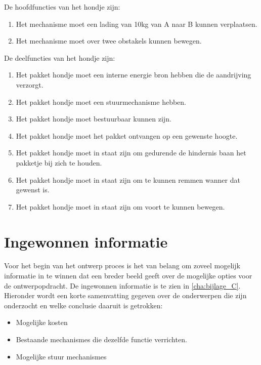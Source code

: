 De hoofdfuncties van het hondje zijn:
\begin{enumerate}
    \item Het mechanisme moet een lading van 10kg van A naar B kunnen verplaatsen.
    \item Het mechanisme moet over twee obstakels kunnen bewegen.
\end{enumerate}
\vspace{\baselineskip}
De deelfuncties van het hondje zijn:
\begin{enumerate}
    \item Het pakket hondje moet een interne energie bron hebben die de aandrijving verzorgt.
    \item Het pakket hondje moet een stuurmechanisme hebben.
    \item Het pakket hondje moet bestuurbaar kunnen zijn.
    \item Het pakket hondje moet het pakket ontvangen op een gewenste hoogte.
    \item Het pakket hondje moet in staat zijn om gedurende de hindernis baan het pakketje bij zich te houden.
    \item Het pakket hondje moet in staat zijn om te kunnen remmen wanner dat gewenst is.
    \item Het pakket hondje moet in staat zijn om voort te kunnen bewegen.
\end{enumerate}


\section{Ingewonnen informatie}
\label{se:Ingewonnen_informatie}
Voor het begin van het ontwerp proces is het van belang om zoveel mogelijk informatie in te winnen dat een breder beeld geeft over de mogelijke opties voor de ontwerpopdracht. De ingewonnen informatie is te zien in \cref{cha:bijlage_C}. Hieronder wordt een korte samenvatting gegeven over de onderwerpen die zijn onderzocht en welke conclusie daaruit is getrokken:\\

\begin{itemize}
    \item Mogelijke kosten
    \item Bestaande mechanismes die dezelfde functie verrichten.
    \item Mogelijke stuur mechanismes
\end{itemize}
\vspace{\baselineskip}

